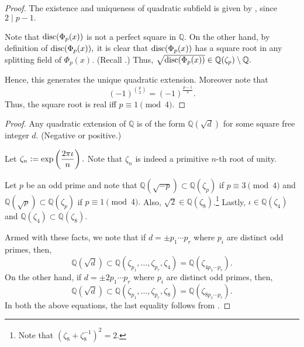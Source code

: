 \uniquequadraticcyclosubfield*\label{prop:uniquequadraticcyclosubfield2}
\begin{flushright}\hyperref[prop:uniquequadraticcyclosubfield]{\upsym}\end{flushright}
\begin{proof}
    The existence and uniqueness of quadratic subfield is given by , since $2 \mid p - 1.$ 

    Note that $\operatorname{disc}(\Phi_p(x))$ is not a perfect square in $\mathbb{Q}.$ On the other hand, by definition of $\operatorname{disc}(\Phi_p(x)),$ it is clear that $\operatorname{disc}(\Phi_p(x))$ has a square root in any splitting field of $\Phi_p(x).$ (Recall .) Thus, $\sqrt{\operatorname{disc}(\Phi_p(x))} \in \mathbb{Q}(\zeta_p) \setminus \mathbb{Q}.$

    Hence, this generates the unique quadratic extension. Moreover note that
    \begin{equation*} 
        (-1)^{\binom{p}{2}} = (-1)^{\frac{p - 1}{2}}.
    \end{equation*}
    Thus, the square root is real iff $p \equiv 1 \pmod{4}.$
\end{proof}

\quadincyclo*\label{cor:quadincyclo2}
\begin{flushright}\hyperref[cor:quadincyclo]{\upsym}\end{flushright}
\begin{proof}
    Any quadratic extension of $\mathbb{Q}$ is of the form $\mathbb{Q}(\sqrt{d})$ for some square free integer $d.$ (Negative or positive.)

    Let $\zeta_n \vcentcolon= \exp\left(\dfrac{2 \pi \iota}{n}\right).$ Note that $\zeta_n$ is indeed a primitive $n$-th root of unity.

    Let $p$ be an odd prime and note that $\mathbb{Q}(\sqrt{-p}) \subset \mathbb{Q}(\zeta_p)$ if $p \equiv 3 \pmod{4}$ and $\mathbb{Q}(\sqrt{p}) \subset \mathbb{Q}(\zeta_p)$ if $p \equiv 1 \pmod{4}.$ Also, $\sqrt{2} \in \mathbb{Q}(\zeta_8)$.\footnote{Note that $(\zeta_8 + \zeta_8^{-1})^2 = 2.$} Lastly, $\iota \in \mathbb{Q}(\zeta_4)$ and $\mathbb{Q}(\zeta_4) \subset \mathbb{Q}(\zeta_8).$

    Armed with these facts, we note that if $d = \pm p_1 \cdots p_r$ where $p_i$ are distinct odd primes, then,
    \begin{equation*} 
        \mathbb{Q}(\sqrt{d}) \subset \mathbb{Q}(\zeta_{p_1}, \ldots, \zeta_{p_r}, \zeta_4) = \mathbb{Q}(\zeta_{4p_1 \cdots p_r}).
    \end{equation*}
    On the other hand, if $d = \pm 2 p_1 \cdots p_r$ where $p_i$ are distinct odd primes, then,
    \begin{equation*} 
        \mathbb{Q}(\sqrt{d}) \subset \mathbb{Q}(\zeta_{p_1}, \ldots, \zeta_{p_r}, \zeta_8) = \mathbb{Q}(\zeta_{8p_1 \cdots p_r}).
    \end{equation*}
    In both the above equations, the last equality follows from .
\end{proof}

